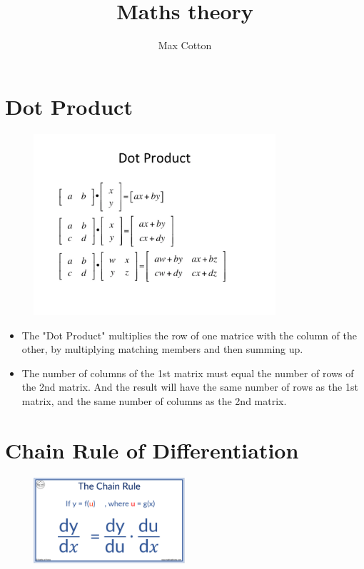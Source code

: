 \documentclass[10pt,a4paper]{article}
\title{Maths theory}
\author{Max Cotton}
\date{}
\begin{document}
\maketitle

\section{Dot Product}

\begin{figure}[h!]
\centering
\includegraphics[width=0.8\textwidth]{src/images/dot-product.png}
\end{figure}

\begin{itemize}
    \item The "Dot Product" multiplies the row of one matrice with the column of the other, by multiplying matching members and then summing up. 
    \item The number of columns of the 1st matrix must equal the number of rows of the 2nd matrix. And the result will have the same number of rows as the 1st matrix, and the same number of columns as the 2nd matrix.
\end{itemize}

\section{Chain Rule of Differentiation}

\begin{figure}[h!]
\centering
\includegraphics[width=0.5\textwidth]{src/images/chain-rule.png}
\end{figure}
\end{document}
